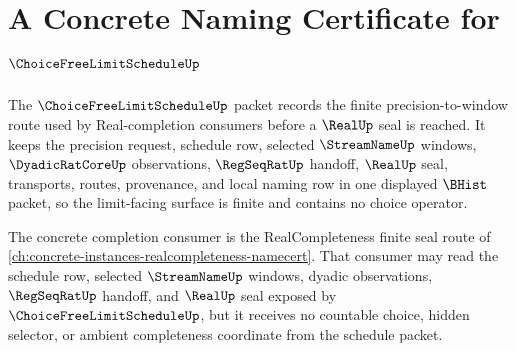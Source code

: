 \chapter{A Concrete Naming Certificate for $\ChoiceFreeLimitScheduleUp$}
\label{ch:concrete-instances-choice-free-limit-schedule-namecert}

The $\ChoiceFreeLimitScheduleUp$ packet records the finite precision-to-window route used by Real-completion consumers before a $\RealUp$ seal is reached. It keeps the precision request, schedule row, selected $\StreamNameUp$ windows, $\DyadicRatCoreUp$ observations, $\RegSeqRatUp$ handoff, $\RealUp$ seal, transports, routes, provenance, and local naming row in one displayed $\BHist$ packet, so the limit-facing surface is finite and contains no choice operator.

The concrete completion consumer is the RealCompleteness finite seal route of \autoref{ch:concrete-instances-realcompleteness-namecert}. That consumer may read the schedule row, selected $\StreamNameUp$ windows, dyadic observations, $\RegSeqRatUp$ handoff, and $\RealUp$ seal exposed by $\ChoiceFreeLimitScheduleUp$, but it receives no countable choice, hidden selector, or ambient completeness coordinate from the schedule packet.

